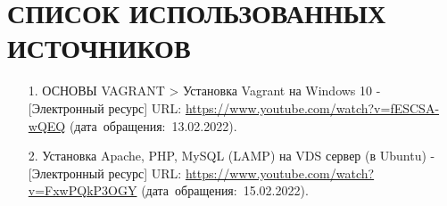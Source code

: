 \documentclass[12pt, a4paper, simple]{eskdtext}
\begin{document}
    
    \section*{СПИСОК ИСПОЛЬЗОВАННЫХ ИСТОЧНИКОВ}
    \begin{enumerate}
        \item[1.] ОСНОВЫ VAGRANT > Установка Vagrant на Windows 10 - [Электронный ресурс]
        URL: \url{https://www.youtube.com/watch?v=fESCSA-wQEQ}
        (дата~обращения:~13.02.2022).
        \item[2.] Установка Apache, PHP, MySQL (LAMP) на VDS сервер (в Ubuntu) - [Электронный ресурс]
        URL: \url{https://www.youtube.com/watch?v=FxwPQkP3OGY}
        (дата~обращения:~15.02.2022).
    \end{enumerate}
    \newpage
\end{document}
